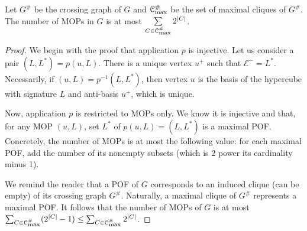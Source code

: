\documentclass[a4paper,UKenglish,numberwithinsect,cleveref, autoref]{lipics-v2021}
\newcommand{\card}[1]{\left| #1 \right|}
\newcommand{\mcalcm}{\mathcal{C}_{\mbox{\scriptsize{max}}}}
\begin{document}
\begin{corollary}
Let $G^{\#}$ be the crossing graph of $G$ and $\mcalcm^{\#}$ be the set of maximal cliques of $G^{\#}$. The number of MOPs in $G$ is at most $\sum\limits_{C \in \mcalcm^{\#}} 2^{\card{C}}$. 
\label{co:mop_crossing}
\end{corollary}
\begin{proof}
We begin with the proof that application $p$ is injective. Let us consider a pair $(L,L^*) = p(u,L)$. There is a unique vertex $u^+$ such that $\mathcal{E}^- = L^*$. Necessarily, if $(u,L) = p^{-1}(L,L^*)$, then vertex $u$ is the basis of the hypercube with signature $L$ and anti-basis $u^+$, which is unique.

Now, application $p$ is restricted to MOPs only. We know it is injective and that, for any MOP $(u,L)$, set $L^*$ of $p(u,L) = (L,L^*)$ is a maximal POF. Concretely, the number of MOPs is at most the following value: for each maximal POF, add the number of its nonempty subsets (which is $2$ power its cardinality minus 1).

We remind the reader that a POF of $G$ corresponds to an induced clique (can be empty) of its crossing graph $G^{\#}$. Naturally, a maximal clique of $G^{\#}$ represents a maximal POF. It follows that the number of MOPs of $G$ is at most $\sum_{C \in \mcalcm^{\#}} (2^{\card{C}} - 1) \le \sum_{C \in \mcalcm^{\#}} 2^{\card{C}}$.
\end{proof}
\end{document}
